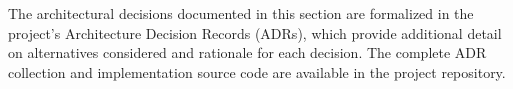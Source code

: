 The architectural decisions documented in this section are formalized in the project's Architecture Decision Records (ADRs), which provide additional detail on alternatives considered and rationale for each decision. The complete ADR collection and implementation source code are available in the project repository.


%
%
%
%
%
